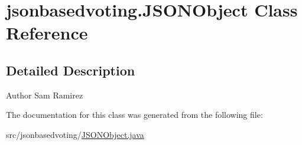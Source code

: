 \hypertarget{classjsonbasedvoting_1_1_j_s_o_n_object}{}\section{jsonbasedvoting.\+J\+S\+O\+N\+Object Class Reference}
\label{classjsonbasedvoting_1_1_j_s_o_n_object}


\subsection{Detailed Description}
\begin{DoxyAuthor}{Author}
Sam Ramirez 
\end{DoxyAuthor}


The documentation for this class was generated from the following file\+:\begin{DoxyCompactItemize}
\item 
src/jsonbasedvoting/\mbox{\hyperlink{_j_s_o_n_object_8java}{J\+S\+O\+N\+Object.\+java}}\end{DoxyCompactItemize}

